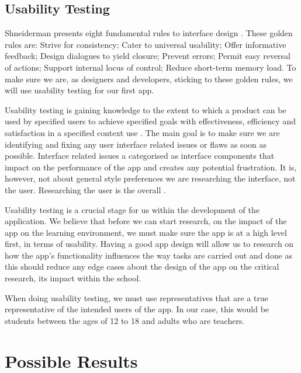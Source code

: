 \documentclass{sigchi}
\begin{document}
\subsection{Usability Testing}
Shneiderman presents eight fundamental rules to interface design \cite{find_sch_ref}. These golden rules are: Strive for consistency; Cater to universal usability; Offer informative feedback; Design dialogues to yield closure; Prevent errors; Permit easy reversal of actions; Support internal locus of control; Reduce short-term memory load. To make sure we are, as designers and developers, sticking to these golden rules, we will use usability testing for our first app.

Usability testing is gaining knowledge to the extent to which a product can be used by specified users to achieve specified goals with effectiveness, efficiency and satisfaction in a specified context use \cite{ISO definition}. The main goal is to make sure we are identifying and fixing any user interface related issues or flaws as soon as possible. Interface related issues a categorised as interface components that impact on the performance of the app and creates any potential frustration. It is, however, not about general style preferences we are researching the interface, not the user. Researching the user is the overall  \cite{suiyan slides usability test}.  

Usability testing is a crucial stage for us within the development of the application. We believe that before we can start research, on the impact of the app on the learning environment, we must make sure the app is at a high level first, in terms of usability. Having a good app design will allow us to research on how the app's functionality influences the way tasks are carried out and done as this should reduce any edge cases about the design of the app on the critical research, its impact within the school. 

When doing usability testing, we must use representatives that are a true representative of the intended users of the app. In our case, this would be students between the ages of 12 to 18 and adults who are teachers. 


\section{Possible Results}
\end{document}
